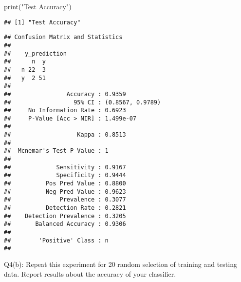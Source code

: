 \documentclass[
]{article}
\newenvironment{Shaded}{\begin{snugshade}}{\end{snugshade}}
\newcommand{\FunctionTok}[1]{\textcolor[rgb]{0.00,0.00,0.00}{#1}}
\newcommand{\NormalTok}[1]{#1}
\newcommand{\OtherTok}[1]{\textcolor[rgb]{0.56,0.35,0.01}{#1}}
\newcommand{\SpecialCharTok}[1]{\textcolor[rgb]{0.00,0.00,0.00}{#1}}
\newcommand{\StringTok}[1]{\textcolor[rgb]{0.31,0.60,0.02}{#1}}
\begin{document}
\begin{Shaded}
\begin{Highlighting}[]
\FunctionTok{print}\NormalTok{(}\StringTok{"Test Accuracy"}\NormalTok{)}
\end{Highlighting}
\end{Shaded}

\begin{verbatim}
## [1] "Test Accuracy"
\end{verbatim}

\begin{Shaded}
\end{Shaded}

\begin{verbatim}
## Confusion Matrix and Statistics
## 
##    y_prediction
##      n  y
##   n 22  3
##   y  2 51
##                                           
##                Accuracy : 0.9359          
##                  95% CI : (0.8567, 0.9789)
##     No Information Rate : 0.6923          
##     P-Value [Acc > NIR] : 1.499e-07       
##                                           
##                   Kappa : 0.8513          
##                                           
##  Mcnemar's Test P-Value : 1               
##                                           
##             Sensitivity : 0.9167          
##             Specificity : 0.9444          
##          Pos Pred Value : 0.8800          
##          Neg Pred Value : 0.9623          
##              Prevalence : 0.3077          
##          Detection Rate : 0.2821          
##    Detection Prevalence : 0.3205          
##       Balanced Accuracy : 0.9306          
##                                           
##        'Positive' Class : n               
## 
\end{verbatim}

Q4(b): Repeat this experiment for 20 random selection of training and
testing data. Report results about the accuracy of your classifier.
\end{document}
